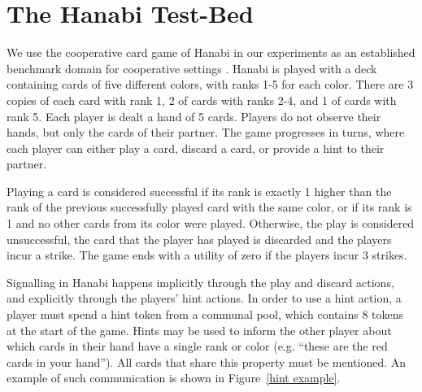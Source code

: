 \documentclass[letterpaper]{article} %
\begin{document}
\section{The Hanabi Test-Bed}

We use the cooperative card game of Hanabi in our experiments as an established benchmark domain for cooperative settings \cite{bard2020hanabi}. 
Hanabi is played with a deck containing cards of five different colors, with ranks 1-5 for each color. There are 3 copies of each card with rank 1, 2 of cards with ranks 2-4, and 1 of cards with rank 5. Each player is dealt a hand of 5 cards. Players do not observe their hands, but only the cards of their partner. 
The game progresses in turns, where each player can either play a card, discard a card, or provide a hint to their partner.
 


Playing a card is considered successful if its rank is exactly 1 higher than the rank of the previous successfully played card with the same color,
or if its rank is 1 and no other cards from its color were played.
Otherwise, the play is considered unsuccessful, the card that the player has played is discarded and the players incur a strike. The game ends with a utility of zero if the players incur 3 strikes.





Signalling in Hanabi happens implicitly through the play and discard actions, and explicitly through the players' hint actions. 
In order to use a hint action, a player must   spend a hint token from a communal pool, which contains 8 tokens at the start of the game. Hints may be used to inform the other player about which cards in their hand have a single rank or color (e.g. ``these are the red cards in your hand''). All cards that share this property must be mentioned. An example of such communication is shown in Figure~\ref{hint example}.
\end{document}
